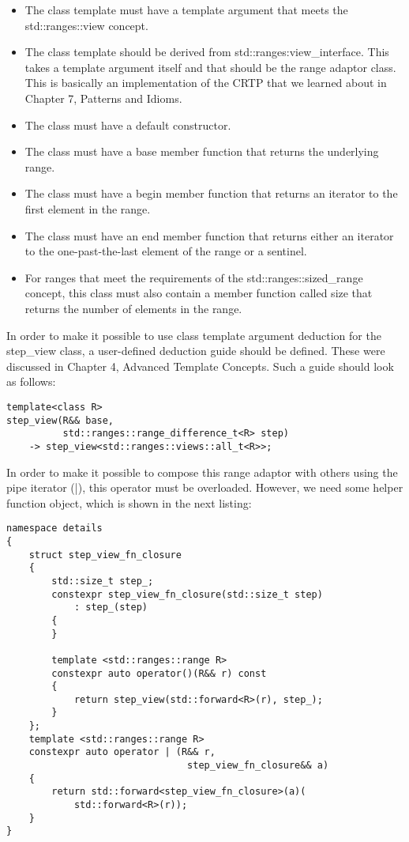 \begin{itemize}
\item
The class template must have a template argument that meets the std::ranges::view concept.

\item
The class template should be derived from std::ranges:view\_interface. This takes a template argument itself and that should be the range adaptor class. This is basically an implementation of the CRTP that we learned about in Chapter 7, Patterns and Idioms.

\item
The class must have a default constructor.

\item
The class must have a base member function that returns the underlying range.

\item
The class must have a begin member function that returns an iterator to the first element in the range.

\item
The class must have an end member function that returns either an iterator to the one-past-the-last element of the range or a sentinel.

\item
For ranges that meet the requirements of the std::ranges::sized\_range concept, this class must also contain a member function called size that returns the number of elements in the range.
\end{itemize}

In order to make it possible to use class template argument deduction for the step\_view class, a user-defined deduction guide should be defined. These were discussed in Chapter 4, Advanced Template Concepts. Such a guide should look as follows:

\begin{lstlisting}[style=styleCXX]
template<class R>
step_view(R&& base,
		  std::ranges::range_difference_t<R> step)
	-> step_view<std::ranges::views::all_t<R>>;
\end{lstlisting}

In order to make it possible to compose this range adaptor with others using the pipe iterator (|), this operator must be overloaded. However, we need some helper function object, which is shown in the next listing:

\begin{lstlisting}[style=styleCXX]
namespace details
{
	struct step_view_fn_closure
	{
		std::size_t step_;
		constexpr step_view_fn_closure(std::size_t step)
			: step_(step)
		{
		}
	
		template <std::ranges::range R>
		constexpr auto operator()(R&& r) const
		{
			return step_view(std::forward<R>(r), step_);
		}
	};
	template <std::ranges::range R>
	constexpr auto operator | (R&& r,
								step_view_fn_closure&& a)
	{
		return std::forward<step_view_fn_closure>(a)(
			std::forward<R>(r));
	}
}
\end{lstlisting}

